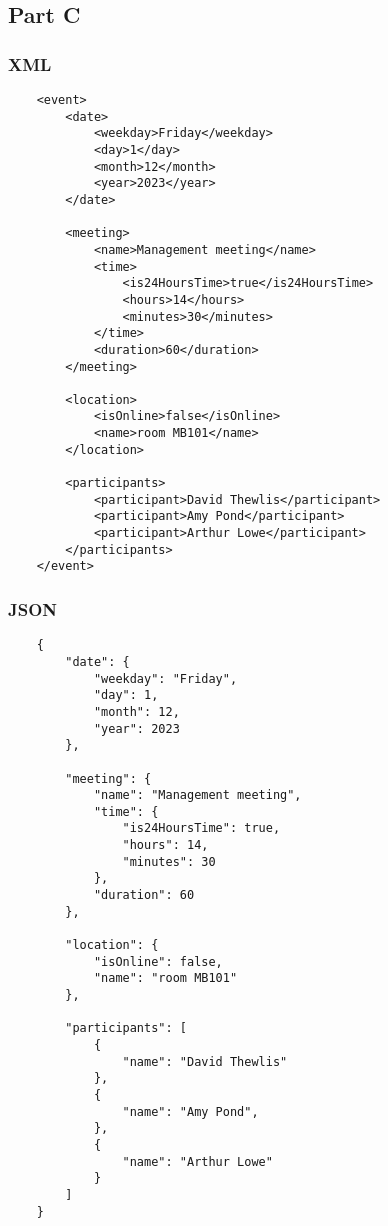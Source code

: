 \documentclass[a4paper]{report}
\begin{document}
\subsection{Part C}

\subsubsection{XML}

\begin{lstlisting}
    <event>
        <date>
            <weekday>Friday</weekday>
            <day>1</day>
            <month>12</month>
            <year>2023</year>
        </date>

        <meeting>
            <name>Management meeting</name>
            <time>
                <is24HoursTime>true</is24HoursTime>
                <hours>14</hours>
                <minutes>30</minutes>
            </time>
            <duration>60</duration>
        </meeting>

        <location>
            <isOnline>false</isOnline>
            <name>room MB101</name>
        </location>

        <participants>
            <participant>David Thewlis</participant>
            <participant>Amy Pond</participant>
            <participant>Arthur Lowe</participant>
        </participants>
    </event>
\end{lstlisting}

\subsubsection{JSON}
\lstset{language=json}

\begin{lstlisting}
    {
        "date": {
            "weekday": "Friday",
            "day": 1,
            "month": 12,
            "year": 2023
        },

        "meeting": {
            "name": "Management meeting",
            "time": {
                "is24HoursTime": true,
                "hours": 14,
                "minutes": 30
            },
            "duration": 60
        },

        "location": {
            "isOnline": false,
            "name": "room MB101"
        },

        "participants": [
            {
                "name": "David Thewlis"
            },
            {
                "name": "Amy Pond",
            },
            {
                "name": "Arthur Lowe"
            }
        ]
    }
\end{lstlisting}
\end{document}
